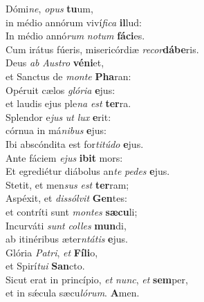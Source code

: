 \evenverse Dómi\textit{ne}, \textit{o}\textit{pus} \textbf{tu}um,~\*\\
\evenverse in médio annórum viví\textit{fi}\textit{ca} \textbf{il}lud:\\
\oddverse In médio annó\textit{rum} \textit{no}\textit{tum} \textbf{fá}\textbf{ci}es.~\*\\
\oddverse Cum irátus fúeris, misericórdiæ \textit{re}\textit{cor}\textbf{dá}\textbf{be}ris.\\
\evenverse Deus \textit{ab} \textit{Au}\textit{stro} \textbf{vé}\textbf{ni}et,~\*\\
\evenverse et Sanctus de \textit{mon}\textit{te} \textbf{Pha}ran:\\
\oddverse Opéruit cælos \textit{gló}\textit{ri}\textit{a} \textbf{e}jus:~\*\\
\oddverse et laudis ejus ple\textit{na} \textit{est} \textbf{ter}ra.\\
\evenverse Splendor e\textit{jus} \textit{ut} \textit{lux} \textbf{e}rit:~\*\\
\evenverse córnua in má\textit{ni}\textit{bus} \textbf{e}jus:\\
\oddverse Ibi abscóndita est for\textit{ti}\textit{tú}\textit{do} \textbf{e}jus.~\*\\
\oddverse Ante fáciem \textit{e}\textit{jus} \textbf{i}\textbf{bit} mors:\\
\evenverse Et egrediétur diábolus an\textit{te} \textit{pe}\textit{des} \textbf{e}jus.~\*\\
\evenverse Stetit, et men\textit{sus} \textit{est} \textbf{ter}ram;\\
\oddverse Aspéxit, et \textit{dis}\textit{sól}\textit{vit} \textbf{Gen}tes:~\*\\
\oddverse et contríti sunt \textit{mon}\textit{tes} \textbf{sæ}\textbf{cu}li;\\
\evenverse Incurváti \textit{sunt} \textit{col}\textit{les} \textbf{mun}di,~\*\\
\evenverse ab itinéribus æter\textit{ntá}\textit{tis} \textbf{e}jus.\\
\oddverse Glória \textit{Pa}\textit{tri}, \textit{et} \textbf{Fí}\textbf{li}o,~\*\\
\oddverse et Spirí\textit{tu}\textit{i} \textbf{San}cto.\\
\evenverse Sicut erat in princípio, \textit{et} \textit{nunc}, \textit{et} \textbf{sem}per,~\*\\
\evenverse et in sǽcula sæcu\textit{ló}\textit{rum}. \textbf{A}men.\\
